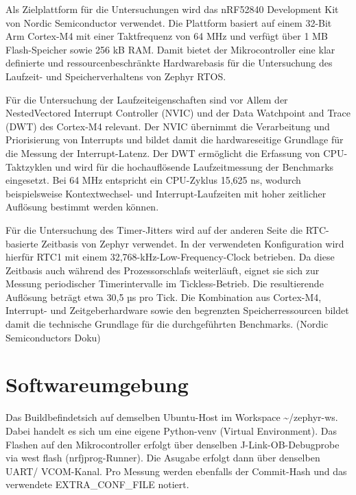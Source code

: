 Als Zielplattform für die Untersuchungen wird das nRF52840 Development Kit von Nordic Semiconductor verwendet. Die Plattform basiert auf einem 32-Bit Arm Cortex-M4 mit einer Taktfrequenz von 64 MHz und verfügt über 1 MB Flash-Speicher sowie 256 kB RAM. Damit bietet der Mikrocontroller eine klar definierte und ressourcenbeschränkte Hardwarebasis für die Untersuchung des Laufzeit- und Speicherverhaltens von Zephyr RTOS.

Für die Untersuchung der Laufzeiteigenschaften sind vor Allem der NestedVectored Interrupt Controller (NVIC) und der Data Watchpoint and Trace (DWT) des Cortex-M4 relevant. Der NVIC übernimmt die Verarbeitung und Priorisierung von Interrupts und bildet damit die hardwareseitige Grundlage für die Messung der Interrupt-Latenz. Der DWT ermöglicht die Erfassung von CPU-Taktzyklen und wird für die hochauflösende Laufzeitmessung der Benchmarks eingesetzt. Bei 64 MHz entspricht ein CPU-Zyklus 15,625 ns, wodurch beispielsweise Kontextwechsel- und Interrupt-Laufzeiten mit hoher zeitlicher Auflösung bestimmt werden können.

Für die Untersuchung des Timer-Jitters wird auf der anderen Seite die RTC-basierte Zeitbasis von Zephyr verwendet. In der verwendeten Konfiguration wird hierfür RTC1 mit einem 32,768-kHz-Low-Frequency-Clock betrieben. Da diese Zeitbasis auch während des Prozessorschlafs weiterläuft, eignet sie sich zur Messung periodischer Timerintervalle im Tickless-Betrieb. Die resultierende Auflösung beträgt etwa 30,5 µs pro Tick. Die Kombination aus Cortex-M4, Interrupt- und Zeitgeberhardware sowie den begrenzten Speicherressourcen bildet damit die technische Grundlage für die durchgeführten Benchmarks. (Nordic Semiconductors Doku)

\section{Softwareumgebung}

Das Buildbefindetsich auf demselben Ubuntu-Host im Workspace \textasciitilde{}/zephyr-ws. Dabei handelt es sich um eine eigene Python-venv (Virtual Environment). Das Flashen auf den Mikrocontroller erfolgt über denselben J-Link-OB-Debugprobe via west flash (nrfjprog-Runner). Die Asugabe erfolgt dann über denselben UART/ VCOM-Kanal. Pro Messung werden ebenfalls der Commit-Hash und das verwendete EXTRA\_CONF\_FILE notiert.


